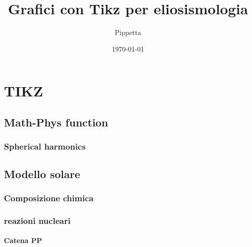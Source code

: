 \documentclass[oneside,12pt,fleqn]{memoir}%
\author{Pippetta}
\title{Grafici con Tikz per eliosismologia}
\date{\today}
\begin{document}
\maketitle
\tableofcontents*

\part{TIKZ}


\chapter{Math-Phys function}

\section{Spherical harmonics}

%

\chapter{Modello solare}

\section{Composizione chimica}

%

\section{reazioni nucleari}

\subsection{Catena PP}
\end{document}
